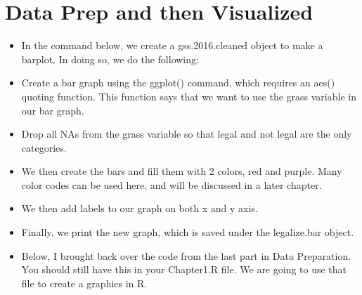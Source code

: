 \documentclass[
  letterpaper,
  DIV=11,
  numbers=noendperiod]{scrreprt}
\begin{document}
\section{Data Prep and then
Visualized}\label{data-prep-and-then-visualized}

\begin{itemize}
\item
  In the command below, we create a gss.2016.cleaned object to make a
  barplot. In doing so, we do the following:
\item
  Create a bar graph using the ggplot() command, which requires an aes()
  quoting function. This function says that we want to use the grass
  variable in our bar graph.
\item
  Drop all NAs from the grass variable so that legal and not legal are
  the only categories.
\item
  We then create the bars and fill them with 2 colors, red and purple.
  Many color codes can be used here, and will be discussed in a later
  chapter.
\item
  We then add labels to our graph on both x and y axis.
\item
  Finally, we print the new graph, which is saved under the legalize.bar
  object.
\item
  Below, I brought back over the code from the last part in Data
  Preparation. You should still have this in your Chapter1.R file. We
  are going to use that file to create a graphics in R.
\end{itemize}
\end{document}
